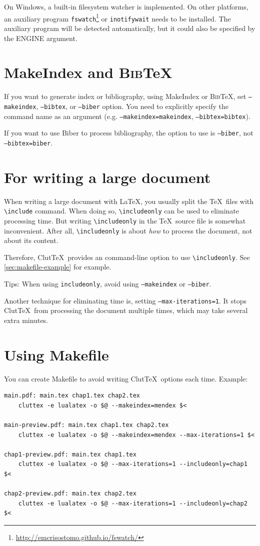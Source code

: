 \documentclass[a4paper]{report}
\newcommand\ClutTeX{Clut\TeX}
\providecommand\BibTeX{\textsc{Bib}\TeX}
\newcommand\texcmd[1]{\texttt{\textbackslash #1}}
\newcommand\metavar[1]{\textnormal{\textsf{#1}}}
\begin{document}
On Windows, a built-in filesystem watcher is implemented.
On other platforms, an auxiliary program \texttt{fswatch}\footnote{\url{http://emcrisostomo.github.io/fswatch/}} or \texttt{inotifywait} needs to be installed.
The auxiliary program will be detected automatically, but it could also be specified by the \metavar{ENGINE} argument.

\section{MakeIndex and \BibTeX}
If you want to generate index or bibliography, using MakeIndex or \BibTeX, set \texttt{--makeindex}, \texttt{--bibtex}, or \texttt{--biber} option.
You need to explicitly specify the command name as an argument (e.g. \texttt{--makeindex=makeindex}, \texttt{--bibtex=bibtex}).

If you want to use Biber to process bibliography, the option to use is \texttt{--biber}, not \texttt{--bibtex=biber}.

\section{For writing a large document}
When writing a large document with \LaTeX, you usually split the \TeX\ files with \texcmd{include} command.
When doing so, \texcmd{includeonly} can be used to eliminate processing time.
But writing \texcmd{includeonly} in the \TeX\ source file is somewhat inconvenient.
After all, \texcmd{includeonly} is about \emph{how} to process the document, not about its content.

Therefore, \ClutTeX\ provides an command-line option to use \texcmd{includeonly}.
See \autoref{sec:makefile-example} for example.

Tips: When using \texttt{includeonly}, avoid using \texttt{--makeindex} or \texttt{--biber}.

Another technique for eliminating time is, setting \texttt{--max-iterations=1}.
It stops \ClutTeX\ from processing the document multiple times, which may take several extra minutes.

\section{Using Makefile}\label{sec:makefile-example}
You can create Makefile to avoid writing \ClutTeX\ options each time.
Example:
\begin{verbatim}
main.pdf: main.tex chap1.tex chap2.tex
    cluttex -e lualatex -o $@ --makeindex=mendex $<

main-preview.pdf: main.tex chap1.tex chap2.tex
    cluttex -e lualatex -o $@ --makeindex=mendex --max-iterations=1 $<

chap1-preview.pdf: main.tex chap1.tex
    cluttex -e lualatex -o $@ --max-iterations=1 --includeonly=chap1 $<

chap2-preview.pdf: main.tex chap2.tex
    cluttex -e lualatex -o $@ --max-iterations=1 --includeonly=chap2 $<
\end{verbatim}
\end{document}
